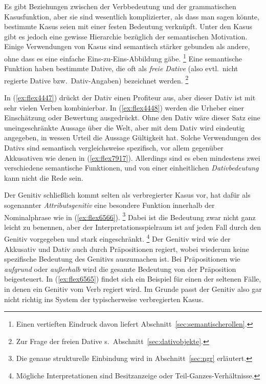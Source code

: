 Es gibt Beziehungen zwischen der Verbbedeutung und der grammatischen Kasusfunktion, aber sie sind wesentlich komplizierter, als dass man sagen könnte, bestimmte Kasus seien mit einer festen Bedeutung verknüpft.
Unter den Kasus gibt es jedoch eine gewisse Hierarchie bezüglich der semantischen Motivation.
Einige Verwendungen von Kasus sind semantisch stärker gebunden als andere, ohne dass es eine einfache Eins-zu-Eins-Abbildung gäbe.%
\footnote{Einen vertieften Eindruck davon liefert Abschnitt~\ref{sec:semantischerollen}.}
Eine semantische Funktion haben \zB bestimmte Dative, die oft als \textit{freie Dative} (also evtl.\ nicht regierte Dative bzw.\ Dativ-Angaben) bezeichnet werden.%
\footnote{Zur Frage der freien Dative s.\ Abschnitt~\ref{sec:dativobjekte}.}

\begin{exe}
  \ex \label{ex:flex4447}
  \begin{xlist}
  \end{xlist}
  \ex \label{ex:flex4448}
  \begin{xlist}
  \end{xlist}
\end{exe}

In (\ref{ex:flex4447}) drückt der Dativ einen Profiteur aus, aber dieser Dativ ist mit sehr vielen Verben kombinierbar.
In (\ref{ex:flex4448}) werden die Urheber einer Einschätzung oder Bewertung ausgedrückt.
Ohne den Dativ wäre dieser Satz eine uneingeschränkte Aussage über die Welt, aber mit dem Dativ wird eindeutig angegeben, in wessen Urteil die Aussage Gültigkeit hat.
Solche Verwendungen des Dativs sind semantisch vergleichsweise spezifisch, vor allem gegenüber \zB Akkusativen wie denen in (\ref{ex:flex7917}).
Allerdings sind es eben mindestens zwei verschiedene semantische Funktionen, und von einer einheitlichen \textit{Dativbedeutung} kann nicht die Rede sein.

Der Genitiv schließlich kommt selten als verbregierter Kasus vor, hat dafür als sogenannter \textit{Attributsgenitiv} eine besondere Funktion innerhalb der Nominalphrase wie in (\ref{ex:flex6566}).%
\footnote{Die genaue strukturelle Einbindung wird in Abschnitt~\ref{sec:ngr} erläutert.}
Dabei ist die Bedeutung zwar nicht ganz leicht zu benennen, aber der Interpretationsspielraum ist auf jeden Fall durch den Genitiv vorgegeben und stark eingeschränkt.%
\footnote{Mögliche Interpretationen sind Besitzanzeige oder Teil-Ganzes-Verhältnisse.}
Der Genitiv wird wie der Akkusativ und Dativ auch durch Präpositionen regiert, wobei wiederum keine spezifische Bedeutung des Genitivs auszumachen ist.
Bei Präpositionen wie \textit{aufgrund} oder \textit{außerhalb} wird die gesamte Bedeutung von der Präposition beigesteuert.
In (\ref{ex:flex6565}) findet sich ein Beispiel für einen der seltenen Fälle, in denen ein Genitiv vom Verb regiert wird.
Im Grunde passt der Genitiv also gar nicht richtig ins System der typischerweise verbregierten Kasus.

